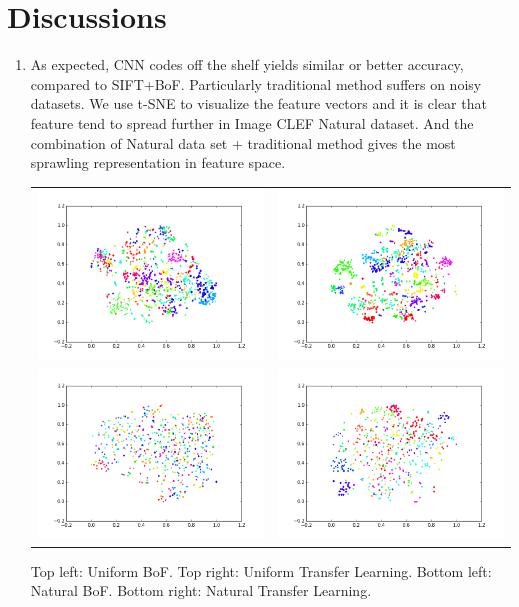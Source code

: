 \documentclass[journal, 10pt]{IEEEtran}
\begin{document}
\section{Discussions}
\begin{enumerate}
  \item As expected, CNN codes off the shelf yields similar or better accuracy, compared to SIFT+BoF. Particularly traditional method suffers on noisy datasets.  We use t-SNE \cite{tSNE} to visualize the feature vectors and it is clear that feature tend to spread further in Image CLEF Natural dataset. And the combination of Natural data set + traditional method gives the most sprawling representation in feature space.
  \begin{tabular}{c@{}c@{}}
  {\includegraphics[width=0.50\linewidth]{tsne_uniform_bof}}  &
  {\includegraphics[width=0.50\linewidth]{tsne_uniform_tl}} \\
  {\includegraphics[width=0.50\linewidth]{tsne_natural_bof}}  &
  {\includegraphics[width=0.50\linewidth]{tsne_natural_tl}} \\
  \end{tabular}
  {\tiny Top left: Uniform BoF. Top right: Uniform Transfer Learning. Bottom left: Natural BoF. Bottom right: Natural Transfer Learning.}


\end{enumerate}
\end{document}
